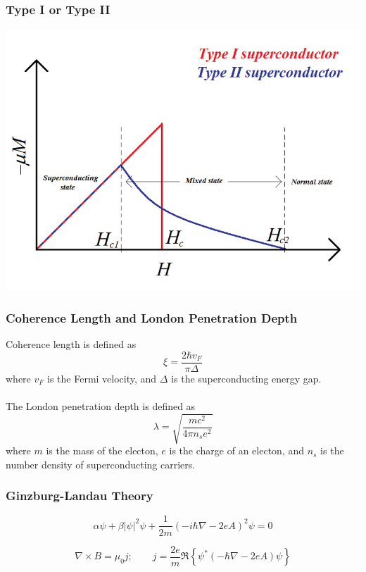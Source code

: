 \documentclass[10pt]{beamer}
\theoremstyle{definition}
\begin{document}
\begin{frame}
    \frametitle{Type I or Type II}

    \begin{center}
    \includegraphics[scale = 0.3]{Magnetisation_and_superconductors}
    \end{center}

\end{frame}


\begin{frame}
    \frametitle{Coherence Length and London Penetration Depth}

    Coherence length is defined as
    \begin{equation}
        \xi = \frac{2 \hbar v_F}{\pi \Delta}
    \end{equation}
    where $v_F$ is the Fermi velocity, and $\Delta$ is the superconducting
    energy gap.
    \\~\\

    The London penetration depth is defined as
    \begin{equation}
        \lambda = \sqrt{\frac{mc^2}{4\pi n_s e^2}}
    \end{equation}
    where $m$ is the mass of the electon, $e$ is the charge of an electon, and
    $n_s$ is the number density of superconducting carriers.

\end{frame}

\begin{frame}
    \frametitle{Ginzburg-Landau Theory}

    \begin{equation}
        \alpha \psi + \beta |\psi|^2\psi+\frac{1}{2m}\left( -i\hbar \nabla-2eA
        \right)^2\psi=0
    \end{equation}

    \begin{equation}
        \nabla \times B = \mu_0 j; \qquad j=\frac{2e}{m}\Re \left\{ \psi^*
            \left( -\hbar \nabla -2eA \right)\psi
        \right\}
    \end{equation}

\end{frame}
\end{document}
